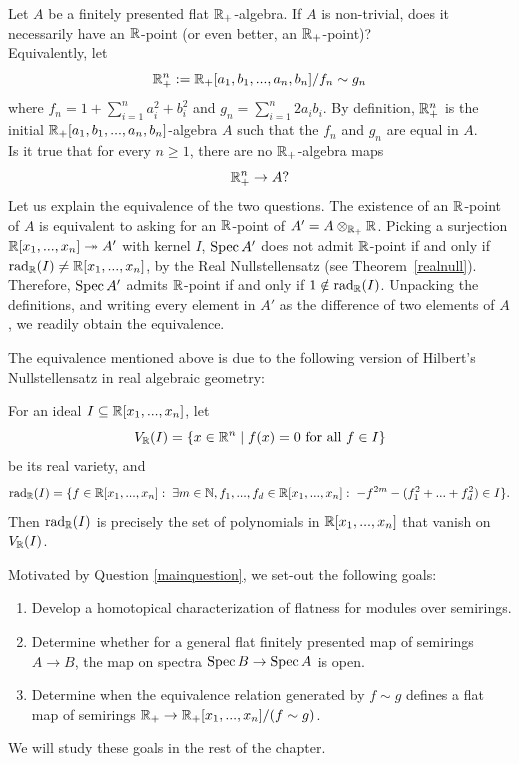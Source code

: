 \begin{question}\label{mainquestion}
Let $A$ be a finitely presented flat $\mathbb{R}_{+}$-algebra. 
If $A$ is non-trivial, does it necessarily have an $\mathbb{R}$-point (or even better, an $\mathbb{R}_{+}$-point)?\\
\indent Equivalently, let 
\[\mathbb{R}^n_{+}:=\mathbb{R}_{+}[a_1,b_1,...,a_n,b_n]/f_n \sim g_n\]
where $f_n=1+\sum_{i=1}^n a_i^2 +b_i^2$ and $g_n=\sum_{i=1}^n 2a_i b_i$. By definition, $\mathbb{R}^n_{+}$ is the initial 
$\mathbb{R}_{+}[a_1,b_1,...,a_n,b_n]$-algebra $A$ such that the $f_n$ and $g_n$ are equal in $A$.\\
\indent Is it true that for every $n \ge 1$, there are no $\mathbb{R}_{+}$-algebra maps
\[\mathbb{R}^n_{+} \rightarrow A?\]
Let us explain the equivalence of the two questions. The existence of an $\mathbb{R}$-point of $A$ is equivalent to asking
for an $\mathbb{R}$-point of $A' = A \otimes_{\mathbb{R}_{+}} \mathbb{R}$. Picking a surjection $\mathbb{R}[x_1,...,x_n] \twoheadrightarrow A'$
with kernel $I$, $\operatorname{Spec}{A'}$ does not admit $\mathbb{R}$-point if and only if $\text{rad}_{\mathbb{R}}(I) \neq \mathbb{R}[x_1,...,x_n]$, by the Real Nullstellensatz (see Theorem~\ref{realnull}). 
Therefore, $\operatorname{Spec}{A'}$ admits $\mathbb{R}$-point if and only if $1 \notin \text{rad}_{\mathbb{R}}(I)$. Unpacking the definitions, 
and writing every element in $A'$ as the difference of two elements of $A$, we readily obtain the equivalence.
\end{question}
The equivalence mentioned above is due to the following version of Hilbert's Nullstellensatz in real algebraic geometry:
\begin{theorem}\label{realnull}
For an ideal $I \subseteq \mathbb{R}[x_1,...,x_n]$, let
\[V_{\mathbb{R}}(I) = \{x \in \mathbb{R}^n \mid f(x)=0 \text{ for all } f \in I\}\]
be its real variety, and 
\[\operatorname{rad}_{\mathbb{R}}(I)=\{f \in \mathbb{R}[x_1,...,x_n]:\; \exists m \in \mathbb{N}, f_1,...,f_d \in \mathbb{R}[x_1,...,x_n] :\;  -f^{2m}- (f_1^2 + ... + f_d^2) \in I\}.\]
Then $\operatorname{rad}_{\mathbb{R}}(I)$ is precisely the set of polynomials in $\mathbb{R}[x_1,...,x_n]$ that vanish on $V_{\mathbb{R}}(I)$. \cite[Chapter XI]{lang_algebra_2002}
\end{theorem}
Motivated by Question \ref{mainquestion}, we set-out the following goals:
\begin{enumerate}
\item[(a)] Develop a homotopical characterization of flatness for modules over semirings.
\item[(b)] Determine whether for a general flat finitely presented map of semirings $A \to B$, 
the map on spectra $\operatorname{Spec}{B} \rightarrow \operatorname{Spec}{A}$ is open.
\item[(c)] Determine when the equivalence relation generated by $f \sim g$ defines a flat map of semirings $\mathbb{R}_{+} \rightarrow \mathbb{R}_{+}[x_1,...,x_n]/(f \sim g)$.
\end{enumerate}
We will study these goals in the rest of the chapter.

